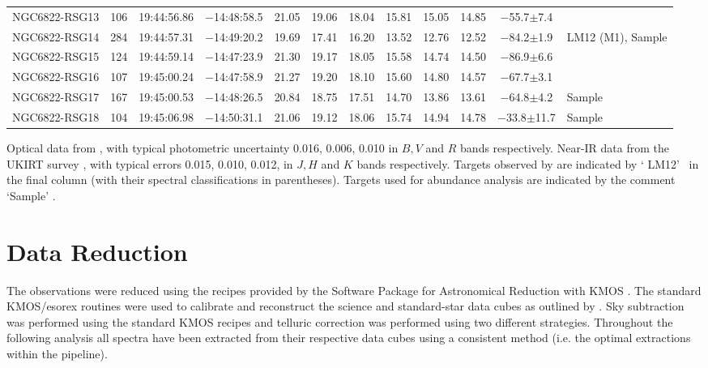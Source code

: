 \begin{table}
\begin{threeparttable}
\begin{tabular}{lrcccccccccl}
NGC6822-RSG13 & 106 &   19:44:56.86  &  $-$14:48:58.5  &  21.05  &  19.06  &  18.04  &  15.81  &  15.05  &  14.85  &  $-$55.7$\pm$7.4 \\
NGC6822-RSG14 & 284 &   19:44:57.31  &  $-$14:49:20.2  &  19.69  &  17.41  &  16.20  &  13.52  &  12.76  &  12.52  &  $-$84.2$\pm$1.9 & LM12 (M1), Sample \\
NGC6822-RSG15 & 124 &   19:44:59.14  &  $-$14:47:23.9  &  21.30  &  19.17  &  18.05  &  15.58  &  14.74  &  14.50  &  $-$86.9$\pm$6.6 \\
NGC6822-RSG16 & 107 &   19:45:00.24  &  $-$14:47:58.9  &  21.27  &  19.20  &  18.10  &  15.60  &  14.80  &  14.57  &  $-$67.7$\pm$3.1 \\
NGC6822-RSG17 & 167 &   19:45:00.53  &  $-$14:48:26.5  &  20.84  &  18.75  &  17.51  &  14.70  &  13.86  &  13.61  &  $-$64.8$\pm$4.2 & Sample\\
NGC6822-RSG18 & 104 &   19:45:06.98  &  $-$14:50:31.1  &  21.06  &  19.12  &  18.06  &  15.74  &  14.94  &  14.78  &\a$-$33.8$\pm$11.7& Sample\\
\hline
\end{tabular}

\begin{tablenotes}
  \item Optical data from
  \protect\cite{2007AJ....134.2474M}, with typical photometric uncertainty 0.016, 0.006, 0.010 in $B, V$ and $R$ bands respectively.
  Near-IR data from the UKIRT survey
  \protect\cite[see][for details]{2012A&A...540A.135S}, with typical errors 0.015, 0.010, 0.012, in $J, H$ and $K$ bands respectively.
  Targets observed by
  \protect\cite{2012AJ....144....2L}
  are indicated by \textquoteleft
  LM12\textquoteright~ in the final column (with their spectral classifications in parentheses).
  Targets used for abundance analysis are indicated by the comment
  \textquoteleft Sample\textquoteright
  .
\end{tablenotes}
\end{threeparttable}
\end{table}



\section{Data Reduction} %
\label{sec:data_reduction}

The observations were reduced using the recipes provided by the Software Package for Astronomical Reduction with KMOS
\citep[SPARK;][]{2013A&A...558A..56D}.
The standard KMOS/esorex routines were used to calibrate and reconstruct the science and standard-star data cubes as outlined by
\cite{2013A&A...558A..56D}.
Sky subtraction was performed using the standard KMOS recipes and telluric correction was performed using two different strategies.
Throughout the following analysis all spectra have been extracted from their respective data cubes using a consistent method (i.e. the optimal extractions within the pipeline).

